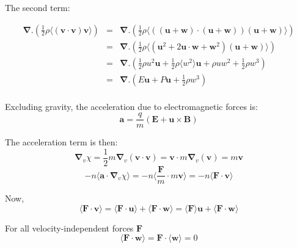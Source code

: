 The second term:


\begin{eqnarray*}
\boldsymbol{\nabla} .\left( \frac{1}{2} \rho \langle \mathbf{\left( v \cdot v\right) v}\rangle \right) &=&     
\boldsymbol{\nabla} .\left( \frac{1}{2} \rho \langle \mathbf{\left(  \left( \mathbf {u+w}\right)\cdot  \left( \mathbf {u+w}\right)\right) \left( \mathbf {u+w}\right) }\rangle \right)  
\\
 &=& 
\boldsymbol{\nabla} .\left( \frac{1}{2} \rho \langle \mathbf{\left( \mathbf {u^\mathrm{2}+\mathrm{2}u \cdot w+w^\mathrm{2}}\right) \left( \mathbf {u+w}\right) }\rangle \right)  
\\
 &=& 
\boldsymbol{\nabla} .\left( 
\frac{1}{2} \rho   u^2 \mathbf{u} 
+\frac{1}{2} \rho \langle w^2 \rangle \mathbf{u} 
+ \rho u w^2 
+\frac{1}{2} \rho  w^3 
\right)  
\\
 &=&
\boldsymbol{\nabla} . \left(
E \mathbf{u}
+
P \mathbf{u}
+ \frac{1}{2} \rho  w^3
\right)
\\
\end{eqnarray*}

Excluding gravity, the acceleration due to electromagnetic forces is:
\begin{equation}
\mathbf{a}= \frac{q}{m} \left( \mathbf {E + u \times B}\right)
\end{equation}

The acceleration term is then:
\begin{equation}
{\boldsymbol{\nabla}}_v \chi 
= 
\frac{1}{2} m {\boldsymbol{\nabla}}_v \left( \mathbf{v \cdot v} \right) 
=
\mathbf{v} \cdot m {\boldsymbol{\nabla}}_v \left( \mathbf{ v} \right) 
=
m \mathbf{v}
\end{equation}
\begin{equation}
- n \langle \mathbf{a} \cdot {\boldsymbol{\nabla}}_v  { \chi } \rangle 
=
- n \langle \frac{\mathbf{F}}{m} \cdot m \mathbf{v} \rangle 
=
- n \langle \mathbf{F} \cdot \mathbf{v} \rangle 
\end{equation}

Now,
\begin{equation}
 \langle \mathbf{F} \cdot \mathbf{v} \rangle 
=
 \langle \mathbf{F} \cdot \mathbf{u} \rangle
+
 \langle \mathbf{F} \cdot \mathbf{w} \rangle
=
 \langle \mathbf{F} \rangle \mathbf{u} 
+
 \langle \mathbf{F} \cdot \mathbf{w} \rangle
\end{equation}

For all velocity-independent forces $\mathbf{F}$
\begin{equation}
\langle \mathbf{F \cdot w} \rangle
=
\mathbf{F \cdot} \langle \mathbf{ w} \rangle
=0
\end{equation}

